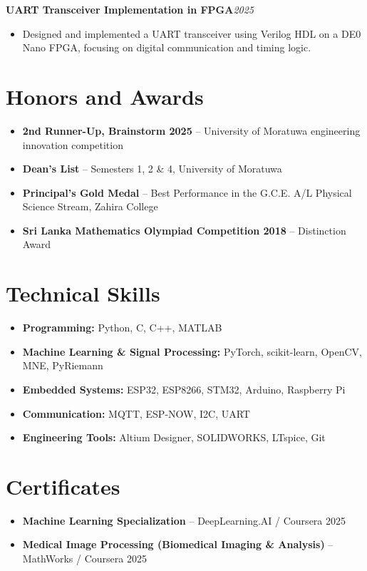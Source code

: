 \documentclass[10pt,a4paper]{article}
\newcommand{\certlink}[1]{\href{#1}{\faLink}}
\newcommand{\projecttitle}[3]{%
\textbf{#1}\hspace{3pt}#2\hfill\textit{#3}\\[-2pt]
}
\begin{document}
\projecttitle{UART Transceiver Implementation in FPGA}{}{2025}
\begin{itemize}
    \item Designed and implemented a UART transceiver using Verilog HDL on a DE0 Nano FPGA, focusing on digital communication and timing logic.
\end{itemize}

\section*{Honors and Awards}
\begin{itemize}
    \item \textbf{2nd Runner-Up, Brainstorm 2025} -- University of Moratuwa engineering innovation competition
    \item \textbf{Dean's List} -- Semesters 1, 2 \& 4, University of Moratuwa
    \item \textbf{Principal's Gold Medal} -- Best Performance in the G.C.E. A/L Physical Science Stream, Zahira College
    \item \textbf{Sri Lanka Mathematics Olympiad Competition 2018} -- Distinction Award
\end{itemize}

\section*{Technical Skills}
\begin{itemize}
    \item \textbf{Programming:} Python, C, C++, MATLAB
    \item \textbf{Machine Learning \& Signal Processing:} PyTorch, scikit-learn, OpenCV, MNE, PyRiemann
    \item \textbf{Embedded Systems:} ESP32, ESP8266, STM32, Arduino, Raspberry Pi
    \item \textbf{Communication:} MQTT, ESP-NOW, I2C, UART
    \item \textbf{Engineering Tools:} Altium Designer, SOLIDWORKS, LTspice, Git
\end{itemize}

\section*{Certificates}
\begin{itemize}
    \item \textbf{Machine Learning Specialization} -- DeepLearning.AI / Coursera
    \hfill 2025 \quad
    \certlink{https://coursera.org/share/74756c16ab1b7697b07571ef62e9c28d}
    \item \textbf{Medical Image Processing (Biomedical Imaging \& Analysis)} -- MathWorks / Coursera
    \hfill 2025 \quad
    \certlink{https://coursera.org/share/e01f4f5b4779523f4c7ae36fcd0245b3}
\end{itemize}
\end{document}
